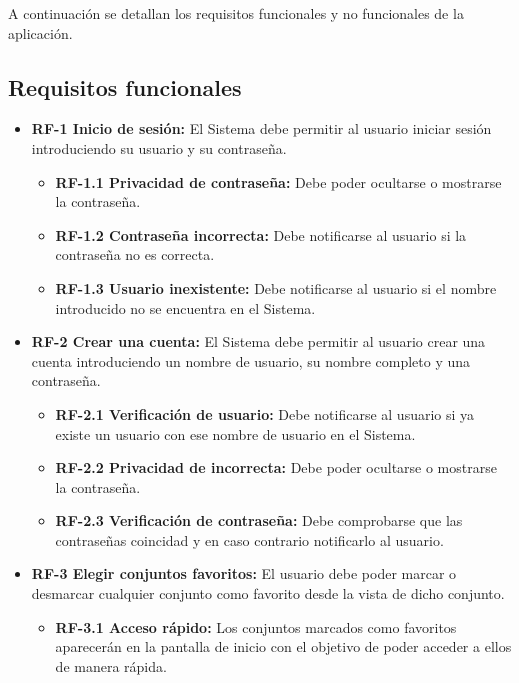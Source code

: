 A continuación se detallan los requisitos funcionales y no funcionales de la aplicación.

\subsection{\textbf{Requisitos funcionales}}

\begin{itemize}
    \item \textbf{RF-1 Inicio de sesión:} El Sistema debe permitir al usuario iniciar sesión introduciendo su usuario y su contraseña.
    \begin{itemize}
        \item \textbf{RF-1.1 Privacidad de contraseña:} Debe poder ocultarse o mostrarse la contraseña.
        \item \textbf{RF-1.2 Contraseña incorrecta:} Debe notificarse al usuario si la contraseña no es correcta.
        \item \textbf{RF-1.3 Usuario inexistente:} Debe notificarse al usuario si el nombre introducido no se encuentra en el Sistema.
    \end{itemize}

    \item \textbf{RF-2 Crear una cuenta:} El Sistema debe permitir al usuario crear una cuenta introduciendo un nombre de usuario, su nombre completo y una contraseña.
    \begin{itemize}
        \item \textbf{RF-2.1 Verificación de usuario:} Debe notificarse al usuario si ya existe un usuario con ese nombre de usuario en el Sistema.
        \item \textbf{RF-2.2 Privacidad de incorrecta:} Debe poder ocultarse o mostrarse la contraseña.
        \item \textbf{RF-2.3 Verificación de contraseña:} Debe comprobarse que las contraseñas coincidad y en caso contrario notificarlo al usuario.
    \end{itemize}

    \item \textbf{RF-3 Elegir conjuntos favoritos:} El usuario debe poder marcar o desmarcar cualquier conjunto como favorito desde la vista de dicho conjunto.
    \begin{itemize}
        \item \textbf{RF-3.1 Acceso rápido:} Los conjuntos marcados como favoritos aparecerán en la pantalla de inicio con el objetivo de poder acceder a ellos de manera rápida.
    \end{itemize}


\end{itemize}
